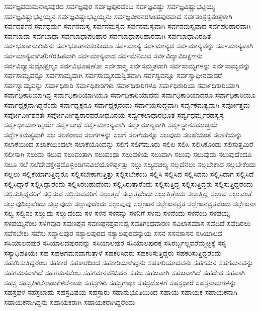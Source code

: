 {ಸರ್ವಜ್ಞಪದುಮನಾಭಪುರದ
ಸರ್ವಜ್ಞಪುರ
ಸರ್ವಜ್ಞಪುರವೆಂಬ
ಸರ್ವಜ್ಞವಿಷ್ಣು
ಸರ್ವಜ್ಞವಿಷ್ಣುಭಟ್ಟಯ್ಯ
ಸರ್ವಜ್ಞವಿಷ್ಣುಭಟ್ಟಯ್ಯನ
ಸರ್ವಜ್ಞವಿಷ್ಣುಭಟ್ಟಯ್ಯನು
ಸರ್ವಜ್ಞವೀರನರಸಿಂಹಪುರವಾದ
ಸರ್ವತಂತ್ರಸ್ವತಂತ್ರಳಾಗಿ
ಸರ್ವದರ್ಶನ
ಸರ್ವಧರ್ಮ
ಸರ್ವನಮಸ್ಯ
ಸರ್ವನಮಸ್ಯದ
ಸರ್ವನಮಸ್ಯವಾಗಿ
ಸರ್ವನಮಸ್ಯವಾದ
ಸರ್ವಪರಿಹಾರವಾಗಿ
ಸರ್ವಬಾದಾ
ಸರ್ವಬಾಧಾ
ಸರ್ವಬಾಧಾಪರಿಹಾರ
ಸರ್ವಬಾಧಾಪರಿಹಾರವಾಗಿ
ಸರ್ವಬಾಧಾವಿರಹಿತ
ಸರ್ವಭೂತಾನುಕಂಪಿನಃ
ಸರ್ವಭೂತಾನುಕಂಪಿಯೂ
ಸರ್ವಮಾನ್ಯ
ಸರ್ವಮಾನ್ಯದ
ಸರ್ವಮಾನ್ಯವನ್ನು
ಸರ್ವಮಾನ್ಯವಾಗಿ
ಸರ್ವಮಾನ್ಯವಾಗಿತೆರಿಗೆರಹಿತವಾಗಿ
ಸರ್ವಮಾನ್ಯವಾದ
ಸರ್ವಮೆನಿಸುವ
ಸರ್ವವಿದ್ಯಾವಿಚಕ್ಷಣನು
ಸರ್ವವಿದ್ಯಾಸುವೈಚಕ್ಷಣ್ಯಂ
ಸರ್ವವಿಭೂಷಣೋ
ಸರ್ವಶಾಸ್ತ್ರ
ಸರ್ವಸಮ್ಮತವಾಗಿ
ಸರ್ವಸಾಮ್ಯಗಳನ್ನು
ಸರ್ವಸಾಮ್ಯವನ್ನು
ಸರ್ವಸಾಮ್ಯವನ್ನೂ
ಸರ್ವಸಾಮ್ಯವಾಗಿ
ಸರ್ವಸಾಮ್ಯಸಮನ್ವಿತವಾಗಿ
ಸರ್ವಸ್ವವನ್ನೂ
ಸರ್ವಸ್ವಾಧೀನವಾದರೆ
ಸರ್ವಸ್ವಾಮ್ಯವನ್ನು
ಸರ್ವಾಧಿಕಾರಿ
ಸರ್ವಾಧಿಕಾರಿಗಳು
ಸರ್ವಾಧಿಕಾರಿಗಳೂ
ಸರ್ವಾಧಿಕಾರಿಯ
ಸರ್ವಾಧಿಕಾರಿಯಾಗಿ
ಸರ್ವಾಧಿಕಾರಿಯಾಗಿದ್ದ
ಸರ್ವಾಧಿಕಾರಿಯಾಗಿಯೂ
ಸರ್ವಾಧಿಕಾರಿಯಾದನು
ಸರ್ವಾಧಿಕಾರಿಯಾದರೂ
ಸರ್ವಾಧಿಕಾರಿಯೂ
ಸರ್ವಾಧ್ಯಕ್ಷನಾಗಿದ್ದನೆಂದು
ಸರ್ವಾಧ್ಯಕ್ಷನೂ
ಸರ್ವಾಧ್ಯಕ್ಷನೆಂದು
ಸರ್ವಾಯಸುದ್ಧವಾಗಿ
ಸರ್ವೈಕಮತ್ಯವಾಗಿ
ಸರ್ವೋತ್ತಮ
ಸರ್ವೋರ್ವೀಶನತಃ
ಸರ್ವೋರ್ವೀಶ್ವರಾರವರೋಧವಿನಯ
ಸರ್ವ್ವಕಲಾಧಾರಭೂತ
ಸರ್ವ್ವಧರ್ಮ್ಮರಹಸ್ಯಸ್ಯ
ಸರ್ವ್ವಧಾರ್ಯಾಹ್ವಯೇ
ಸರ್ವ್ವಬಾಧೆ
ಸರ್ವ್ವಮಾಂನ್ಯವಾಗಿ
ಸರ್ವ್ವಮಾನ್ಯವಾಗಿ
ಸರ್ವ್ವಸ್ಥಾನಸಮುಚ್ಚಯೆ
ಸರ್ವ್ವೇಕಮತ್ಯವಾಗಿ
ಸಲ
ಸಲಕರಾಜು
ಸಲಗಗಳನ್ನು
ಸಲಗೆ
ಸಲಗೆಯನ್ನೂ
ಸಲವುದು
ಸಲಹೆಯಂತೆ
ಸಲಾಕೆಯನ್ನು
ಸಲಾಕೆಯಿಂದ
ಸಲಾಕೆಯಿಂದಲೇ
ಸಲಾಕೆಯೊಂದನ್ನು
ಸಲಿಗೆ
ಸಲಿಗೆಮೂರು
ಸಲಿಲ
ಸಲಿಸಿ
ಸಲಿಸಿಕೊಂಡು
ಸಲಿಸುತ್ತಮಿರೆ
ಸಲೀಸಾಗಿ
ಸಲುದು
ಸಲುವ
ಸಲುವಂತಾಗಿ
ಸಲುವಂಥಾ
ಸಲುವಳಿಯ
ಸಲುವಾಗಿ
ಸಲುವು
ಸಲುವುದು
ಸಲುವುದೆಂದೂ
ಸಲೂ
ಸಲೆ
ಸಲೆದೇವಕ್ಷೇತ್ರದೊಳ್ಬಿಂಡಿಗನವಿಲೆಯೊಳಿರ್ಪ್ಪತ್ತು
ಸಲ್ಗು
ಸಲ್ಯದಚಲ್ಯ
ಸಲ್ಲದೆನಲು
ಸಲ್ಲಬೇಕಾದ
ಸಲ್ಲಬೇಕೆಂದು
ಸಲ್ಲಲು
ಸಲ್ಲಿಕೆಯಾಗುತ್ತಿದ್ದರೂ
ಸಲ್ಲಿಸಬೇಕಾಗುತ್ತಿತ್ತು
ಸಲ್ಲಿಸಬೇಕೆಂಬ
ಸಲ್ಲಿಸಿ
ಸಲ್ಲಿಸಿದ
ಸಲ್ಲಿಸಿದನು
ಸಲ್ಲಿಸಿದಾಗ
ಸಲ್ಲಿಸಿದೆ
ಸಲ್ಲಿಸಿದ್ದಾರೆ
ಸಲ್ಲಿಸಿದ್ದಾರೆಂದು
ಸಲ್ಲಿಸಿರಬಹುದೆಂದು
ಸಲ್ಲಿಸಿರುತ್ತಾರೆಂದು
ಸಲ್ಲಿಸುತ್ತಿದ್ದ
ಸಲ್ಲಿಸುತ್ತಿದ್ದರು
ಸಲ್ಲಿಸುತ್ತಿದ್ದರೆಂದು
ಸಲ್ಲಿಸುತ್ತಿದ್ದವರಿಗೆ
ಸಲ್ಲಿಸುವ
ಸಲ್ಲಿಸುವವರಿಗೆ
ಸಲ್ಲುತ್ತದೆ
ಸಲ್ಲುತ್ತದೆಂದು
ಸಲ್ಲುತ್ತಿತ್ತೆಂದು
ಸಲ್ಲುತ್ತಿದ್ದ
ಸಲ್ಲುವ
ಸಲ್ಲುವಂತೆ
ಸಲ್ಲುವುದಿಲ್ಲವೆಂದು
ಸಲ್ಲುವುದು
ಸಲ್ಲುವುದೆಂದು
ಸಲ್ಲುವುವು
ಸಲ್ಲೇಖನ
ಸಲ್ಲೇಖನವ್ರತ
ಸಲ್ಲೇಖನವ್ರತವೆಂದು
ಸಲ್ಲೇಖನಾ
ಸಲ್ವ
ಸಲ್ವಿನಂ
ಸಲ್ವುದು
ಸಲ್ವುದೆಂದು
ಸಳ
ಸಳನ
ಸಳನನ್ನು
ಸಳನಿಗೆ
ಸಳನು
ಸಳನೆಂದು
ಸಳನೆಂಬ
ಸಳಪಯ್ಯ
ಸಳಪಯ್ಯನೆಂಬ
ಸಳಿಗವುಡ
ಸವಣಪ್ಪನ
ಸವಣಪ್ಪನಶ್ರವಣಪ್ಪ
ಸವತಿಗಂಧವಾರಣ
ಸವಿಲಾಸಮಾಸ
ಸವೆದಿದೆ
ಸವೆದಿರಲು
ಸವೆಸಬೇಕು
ಸವೆಸು
ಸಶ್ಯಾಲಪುರ
ಸಶ್ಯಾಲಪುರದ
ಸಶ್ಯಾಲಪುರವನ್ನುಯ
ಸಸನ
ಸಸನಶಾಸನ
ಸಸಿಯಾಲದ
ಸಸಿಯಾಲದಪುರ
ಸಸಿಯಾಲದಪುರವನ್ನು
ಸಸಿಯಾಲಪುರ
ಸಸಿಯಾಲಪುರಕ್ಕೆ
ಸಸಿರರ್ಬ್ಬಲ್ಲವರೆಮ್ಮೞ್ದಕ್ಕೆ
ಸಸ್ಯ
ಸಸ್ಯಾಧಿಪತಿಯೇ
ಸಹ
ಸಹಅಗಮನವಾಗುತ್ತಾಳೆ
ಸಹಕರಿಸಿದರು
ಸಹಕರಿಸುತ್ತಿದ್ದರು
ಸಹಕರಿಸುತ್ತಿದ್ದರೆಂದು
ಸಹಕರಿಸುತ್ತಿದ್ದರೆಂಬ
ಸಹಕಾರ
ಸಹಕಾರದಿಂದ
ಸಹಕಾರಿಯಾಗಿದ್ದನು
ಸಹಕಾರಿಯಾದವನು
ಸಹಗಮನ
ಸಹಗಮನವನ್ನು
ಸಹಗಮನವಾಗಿದೆ
ಸಹಗಮನವೆಂಬ
ಸಹಗಮನವೆನಿಸಿದರೆ
ಸಹಜ
ಸಹಜವಾಗಿ
ಸಹಜವಾಗಿದೆ
ಸಹದೇವ
ಸಹವಾಗಿ
ಸಹಸ್ರ
ಸಹಸ್ರಕಿಳಲೆನಾಡುಕೆಳಲೆನಾಡು
ಸಹಸ್ರಗಳು
ಸಹಸ್ರಗಾಥಾ
ಸಹಸ್ರದೊಳಗೆ
ಸಹಸ್ರಧಾರೆ
ಸಹಸ್ರನಾಮಗಳನ್ನು
ಸಹಸ್ರಫಳ
ಸಹಸ್ರಬಾಹು
ಸಹಸ್ರವಿಷಯ
ಸಹಸ್ರಾರು
ಸಹಾನುಭೂತಿಯಿಂದ
ಸಹಾಯ
ಸಹಾಯಕ
ಸಹಾಯಕನಾಗಿ
ಸಹಾಯಕನಾಗಿದ್ದನು
ಸಹಾಯಕರಾಗಿ
ಸಹಾಯಕರಾಗಿದ್ದರೆಂದು
}
